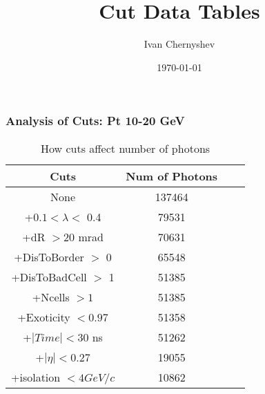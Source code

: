 \documentclass{beamer}
\title{Cut Data Tables}
\author{Ivan Chernyshev}
\date{\today}
\begin{document}
 

\frame 
{ 
\frametitle{Analysis of Cuts: Pt 10-20 GeV} 
\begin{table} 
\caption{How cuts affect number of photons} 
\centering 
\begin{tabular}{c c c c} 
\hline\hline 
Cuts & Num of Photons\\ [0.5ex] 
\hline
None & 137464\\
+$0.1 < \lambda <$ 0.4 & 79531\\
+dR $> 20$ mrad & 70631\\
+DisToBorder $>$ 0 & 65548\\
+DisToBadCell $>$ 1 & 51385\\
+Ncells $> 1$ & 51385\\
+Exoticity $< 0.97$ & 51358\\
+$|Time| < 30$ ns & 51262\\
+$|\eta| < 0.27$ & 19055\\
+isolation $< 4 GeV/c$ & 10862\\
[1ex] 
\hline 
\end{tabular} 
\label{table:nonlin} 
\end{table} 
} 
\end{document}
